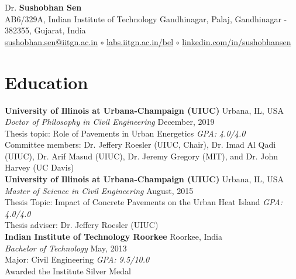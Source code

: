 \documentclass[12pt]{article}
\begin{document}
 \sloppy %
\begin{center}
{\large Dr. \textbf{Sushobhan Sen}} \\
AB6/329A, Indian Institute of Technology Gandhinagar, Palaj, Gandhinagar - 382355, Gujarat, India \\
\href{mailto:sushobhan.sen@iitgn.ac.in}{sushobhan.sen@iitgn.ac.in} $\circ$ \href{https://labs.iitgn.ac.in/bel//}{labs.iitgn.ac.in/bel} $\circ$ \href{http://linkedin.com/in/sushobhansen}{linkedin.com/in/sushobhansen}
\end{center} 

\hfill %
\section*{Education}
\bigskip 
\textbf{University of Illinois at Urbana-Champaign (UIUC)} \hfill Urbana, IL, USA\\
\textit{Doctor of Philosophy in Civil Engineering} \hfill December, 2019\\
Thesis topic: Role of Pavements in Urban Energetics \hfill \textit{GPA: 4.0/4.0}\\
Committee members: Dr. Jeffery Roesler (UIUC, Chair), Dr. Imad Al Qadi (UIUC), Dr. Arif Masud (UIUC), Dr. Jeremy Gregory (MIT), and Dr. John Harvey (UC Davis)\\

\textbf{University of Illinois at Urbana-Champaign (UIUC)} \hfill Urbana, IL, USA\\
\textit{Master of Science in Civil Engineering} \hfill August, 2015\\
Thesis Topic: Impact of Concrete Pavements on the Urban Heat Island \hfill \textit{GPA: 4.0/4.0} \\
Thesis adviser: Dr. Jeffery Roesler (UIUC) \\

\textbf{Indian Institute of Technology Roorkee} \hfill Roorkee, India\\
\textit{Bachelor of Technology} \hfill May, 2013\\
Major: Civil Engineering \hfill \textit{GPA: 9.5/10.0} \\
Awarded the Institute Silver Medal  %
\end{document}
